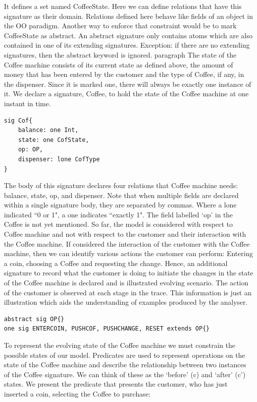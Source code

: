 \documentclass[a4paper,12pt]{extarticle}
\begin{document}
\textrm{ It defines a set named CoffeeState. Here we can define relations that have this signature as their domain. Relations defined here behave like fields of an object in the OO paradigm. Another way to enforce that constraint would be to mark CoffeeState as abstract. An abstract signature only contains atoms which are also contained in one of its extending signatures. Exception: if there are no extending signatures, then the abstract keyword is ignored.
paragraph{}
The state of the Coffee machine consists of its current state as defined above, the amount of money that has been entered by the customer and the type of Coffee, if any, in the dispenser. Since it is marked one, there will always be exactly one instance of it. We declare a signature, Coffee, to hold the state of the Coffee machine at one instant in time.}
\begin{verbatim}
sig Cof{
	balance: one Int,
	state: one CofState,
	op: OP,
	dispenser: lone CofType
}
\end{verbatim}
\textrm{ The body of this signature declares four relations that Coffee machine needs: balance, state, op, and dispenser. Note that when multiple fields are declared within a single signature body, they are separated by commas. Where a lone indicated ``0 or 1", a one indicates ``exactly 1". The field labelled `op’ in the Coffee is not yet mentioned. So far, the model is considered with respect to Coffee machine and not with respect to the customer and their interaction with the Coffee machine. If considered the interaction of the customer with the Coffee machine, then we can identify various actions the customer can perform: Entering a coin, choosing a Coffee and requesting the change. Hence, an additional signature to record what the customer is doing to initiate the changes in the state of the Coffee machine is declared and is illustrated evolving scenario. The action of the customer is observed at each stage in the trace. This information is just an illustration which aids the understanding of examples produced by the analyser.} 
\begin{verbatim}	
abstract sig OP{}
one sig ENTERCOIN, PUSHCOF, PUSHCHANGE, RESET extends OP{}
\end{verbatim}
\textrm{To represent the evolving state of the Coffee machine we must constrain the possible states of our model. Predicates are used to represent operations on the state of the Coffee machine and describe the relationship between two instances of the Coffee signature. We can think of these as the `before' (c) and `after' (c') states. We present the predicate that presents the customer, who has just inserted a coin, selecting the Coffee to purchase:}
\end{document}
